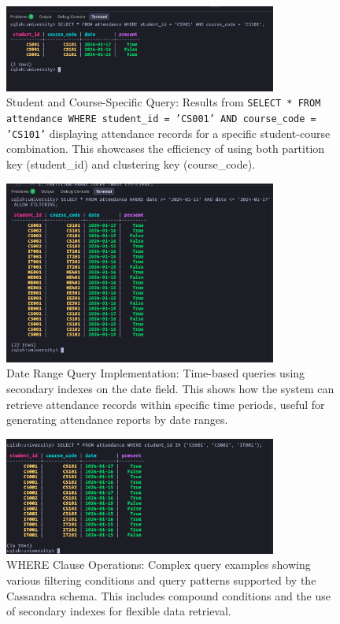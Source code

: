 \begin{figure}[H]
  \centering
  \includegraphics[width=0.8\textwidth]{task-2/screenshots/select-where_student_id_and_course_code.png}
  \caption{Student and Course-Specific Query: Results from \texttt{SELECT * FROM attendance WHERE student\_id = 'CS001' AND course\_code = 'CS101'} displaying attendance records for a specific student-course combination. This showcases the efficiency of using both partition key (student\_id) and clustering key (course\_code).}
  \label{fig:task2-select-student-course}
\end{figure}

\begin{figure}[H]
  \centering
  \includegraphics[width=0.8\textwidth]{task-2/screenshots/date_range_query.png}
  \caption{Date Range Query Implementation: Time-based queries using secondary indexes on the date field. This shows how the system can retrieve attendance records within specific time periods, useful for generating attendance reports by date ranges.}
  \label{fig:task2-date-range}
\end{figure}

\begin{figure}[H]
  \centering
  \includegraphics[width=0.8\textwidth]{task-2/screenshots/where_query.png}
  \caption{WHERE Clause Operations: Complex query examples showing various filtering conditions and query patterns supported by the Cassandra schema. This includes compound conditions and the use of secondary indexes for flexible data retrieval.}
  \label{fig:task2-where-query}
\end{figure}

